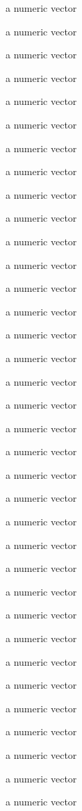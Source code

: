 \begin{Format}
\begin{description}
\item[] a numeric vector
\item[] a numeric vector
\item[] a numeric vector
\item[] a numeric vector
\item[] a numeric vector
\item[] a numeric vector
\item[] a numeric vector
\item[] a numeric vector
\item[] a numeric vector
\item[] a numeric vector
\item[] a numeric vector
\item[] a numeric vector
\item[] a numeric vector
\item[] a numeric vector
\item[] a numeric vector
\item[] a numeric vector
\item[] a numeric vector
\item[] a numeric vector
\item[] a numeric vector
\item[] a numeric vector
\item[] a numeric vector
\item[] a numeric vector
\item[] a numeric vector
\item[] a numeric vector
\item[] a numeric vector
\item[] a numeric vector
\item[] a numeric vector
\item[] a numeric vector
\item[] a numeric vector
\item[] a numeric vector
\item[] a numeric vector
\item[] a numeric vector
\item[] a numeric vector
\item[] a numeric vector
\item[] a numeric vector

\end{description}
\end{Format}
